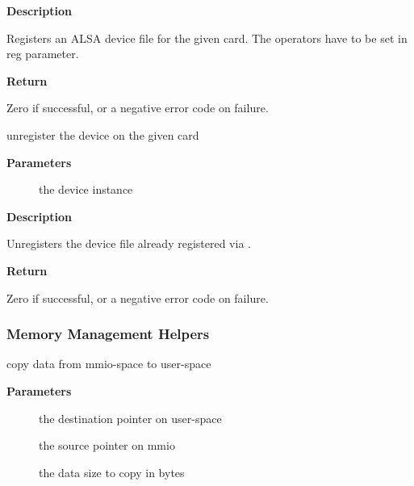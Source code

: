 \documentclass[a4paper,8pt,english]{sphinxmanual}
\begin{document}
\textbf{Description}

Registers an ALSA device file for the given card.
The operators have to be set in reg parameter.

\textbf{Return}

Zero if successful, or a negative error code on failure.

\begin{fulllineitems}
\label{sound/kernel-api/alsa-driver-api:c.snd_unregister_device}
unregister the device on the given card

\end{fulllineitems}


\textbf{Parameters}
\begin{description}
\item[{}] \leavevmode
the device instance

\end{description}

\textbf{Description}

Unregisters the device file already registered via
.

\textbf{Return}

Zero if successful, or a negative error code on failure.


\subsubsection{Memory Management Helpers}
\label{sound/kernel-api/alsa-driver-api:memory-management-helpers}

\begin{fulllineitems}
\label{sound/kernel-api/alsa-driver-api:c.copy_to_user_fromio}
copy data from mmio-space to user-space

\end{fulllineitems}


\textbf{Parameters}
\begin{description}
\item[{}] \leavevmode
the destination pointer on user-space

\item[{}] \leavevmode
the source pointer on mmio

\item[{}] \leavevmode
the data size to copy in bytes

\end{description}
\end{document}
